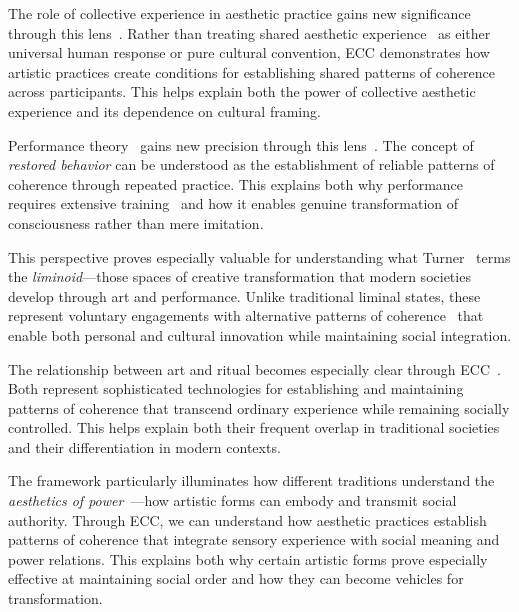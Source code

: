 The role of collective experience in aesthetic practice gains new significance through this lens~\cite{schieffelin1976sorrow,collins2004interaction}. Rather than treating shared aesthetic experience~ as either universal human response or pure cultural convention, ECC demonstrates how artistic practices create conditions for establishing shared patterns of coherence across participants. This helps explain both the power of collective aesthetic experience and its dependence on cultural framing.

Performance theory~ gains new precision through this lens~\cite{schechner1985between,schieffelin1985performance}. The concept of \textit{restored behavior} can be understood as the establishment of reliable patterns of coherence through repeated practice. This explains both why performance requires extensive training~ and how it enables genuine transformation of consciousness rather than mere imitation.

This perspective proves especially valuable for understanding what Turner~\cite{turner1982ritual,turner1969ritual} terms the \textit{liminoid}—those spaces of creative transformation that modern societies develop through art and performance. Unlike traditional liminal states, these represent voluntary engagements with alternative patterns of coherence~ that enable both personal and cultural innovation while maintaining social integration.

The relationship between art and ritual becomes especially clear through ECC~\cite{turner1982ritual,rappaport1999ritual}. Both represent sophisticated technologies for establishing and maintaining patterns of coherence that transcend ordinary experience while remaining socially controlled. This helps explain both their frequent overlap in traditional societies and their differentiation in modern contexts.

The framework particularly illuminates how different traditions understand the \textit{aesthetics of power}~\cite{morphy1991ancestral,kapferer2004ritual}—how artistic forms can embody and transmit social authority. Through ECC, we can understand how aesthetic practices establish patterns of coherence that integrate sensory experience with social meaning and power relations. This explains both why certain artistic forms prove especially effective at maintaining social order and how they can become vehicles for transformation.

